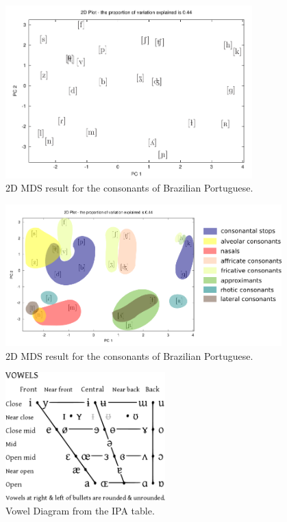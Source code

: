 \begin{figure}[h!]
\centering
\includegraphics[width=0.85\textwidth]{images/mds_consonantsPT.pdf}
\caption{2D MDS result for the consonants of Brazilian Portuguese.}
\label{fig:mds2Dconsonants}
\end{figure}

\begin{figure}[h!]
\centering
\includegraphics[width=0.95\textwidth]{images/mds_consonant_PT_class.png}
\caption{2D MDS result for the consonants of Brazilian Portuguese.}
\label{fig:mds_consonant_PT_class}
\end{figure}

\begin{figure}[h!]
\centering
\includegraphics[width=0.55\textwidth]{images/IPA_Vowels.pdf}
\caption{Vowel Diagram from the IPA table.}
\label{fig:IPA_Vowels}
\end{figure}

